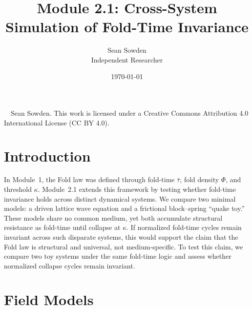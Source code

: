 \documentclass[12pt]{article}
\title{Module 2.1: Cross-System Simulation of Fold-Time Invariance}
\author{Sean Sowden \\ \small Independent Researcher}
\date{\today}
\begin{document}
\maketitle
\begin{center}
    \vspace{1em}
    {\small \textcopyright\ \the\year\ Sean Sowden.
    This work is licensed under a Creative Commons Attribution 4.0 International License (CC BY 4.0).}
\end{center}

\setcounter{section}{0}
\setcounter{secnumdepth}{2} %
\setcounter{tocdepth}{2}    %
\renewcommand{\thesection}{2.1.\arabic{section}}
\renewcommand{\thesubsection}{2.1.\arabic{section}.\arabic{subsection}}
\renewcommand{\thesubsubsection}{2.1.\arabic{section}.\arabic{subsection}.\arabic{subsubsection}}
\section{Introduction}
In Module~1, the Fold law was defined through fold-time $\bar{\tau}$, fold density $\Phi$, and threshold $\kappa$. Module~2.1 extends this framework by testing whether fold-time invariance holds across distinct dynamical systems. We compare two minimal models: a driven lattice wave equation and a frictional block--spring ``quake toy.'' These models share no common medium, yet both accumulate structural resistance as fold-time until collapse at $\kappa$. If normalized fold-time cycles remain invariant across such disparate systems, this would support the claim that the Fold law is structural and universal, not medium-specific. To test this claim, we compare two toy systems under the same fold-time logic and assess whether normalized collapse cycles remain invariant.
\section{Field Models}
\end{document}
